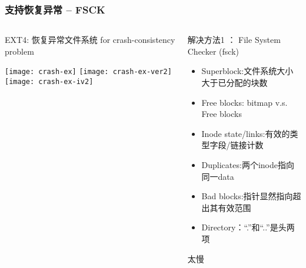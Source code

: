 \begin{frame}[fragile]
	\frametitle{支持恢复异常 -- FSCK}
	\begin{columns}
		\begin{column}{.4\textwidth}
			EXT4: 恢复异常文件系统 for crash-consistency problem
			
			\centering
			\texttt{[image: crash-ex]}
			\texttt{[image: crash-ex-ver2]}
			\texttt{[image: crash-ex-iv2]}	
		\end{column}
		\begin{column}{.6\textwidth}			
			解决方法1 ： File System Checker (fsck)
			\begin{itemize}
				\item Superblock:文件系统大小大于已分配的块数 \pause
				\item Free blocks: bitmap v.s. Free blocks \pause
				\item Inode state/links:有效的类型字段/链接计数 \pause
				\item Duplicates:两个inode指向同一data  \pause
				\item Bad blocks:指针显然指向超出其有效范围 \pause
				\item Directory：“.”和“..”是头两项
			\end{itemize}
			\pause
			\Large 太慢
		\end{column}
	\end{columns}
	
\end{frame}

